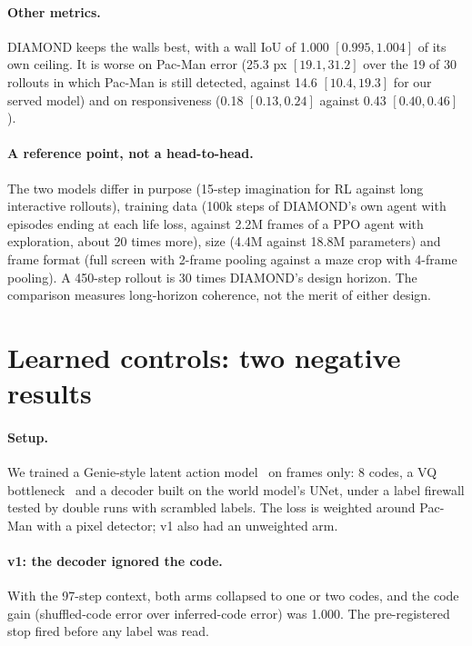 \documentclass[11pt]{article}
\begin{document}
\paragraph{Other metrics.} DIAMOND keeps the walls best, with a wall IoU of 1.000 $[0.995,1.004]$ of its own
ceiling. It is worse on Pac-Man error (25.3 px $[19.1,31.2]$ over the 19 of 30 rollouts in which Pac-Man is still
detected, against 14.6 $[10.4,19.3]$ for our served model) and on responsiveness (0.18 $[0.13,0.24]$ against 0.43
$[0.40,0.46]$).

\paragraph{A reference point, not a head-to-head.} The two models differ in purpose (15-step imagination for RL
against long interactive rollouts), training data (100k steps of DIAMOND's own agent with episodes ending at each
life loss, against 2.2M frames of a PPO agent with exploration, about 20 times more), size (4.4M against 18.8M
parameters) and frame format (full screen with 2-frame pooling against a maze crop with 4-frame pooling). A
450-step rollout is 30 times DIAMOND's design horizon. The comparison measures long-horizon coherence, not the
merit of either design.

\section{Learned controls: two negative results}
\label{sec:lam}
\paragraph{Setup.} We trained a Genie-style latent action model~\cite{bruce2024genie} on frames only: 8 codes, a VQ
bottleneck~\cite{vandenoord2017vqvae} and a decoder built on the world model's UNet, under a label firewall tested
by double runs with scrambled labels. The loss is weighted around Pac-Man with a pixel detector; v1 also had an
unweighted arm.

\paragraph{v1: the decoder ignored the code.} With the 97-step context, both arms collapsed to one or two codes, and
the code gain (shuffled-code error over inferred-code error) was 1.000. The pre-registered stop fired before any
label was read.
\end{document}
